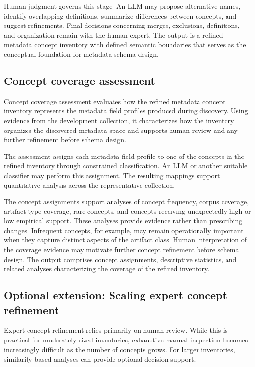 \documentclass{article}
\begin{document}
Human judgment governs this stage. An LLM may propose alternative names, identify overlapping definitions, summarize differences between concepts, and suggest refinements. Final decisions concerning merges, exclusions, definitions, and organization remain with the human expert. The output is a refined metadata concept inventory with defined semantic boundaries that serves as the conceptual foundation for metadata schema design.

\subsection{Concept coverage assessment}

Concept coverage assessment evaluates how the refined metadata concept inventory represents the metadata field profiles produced during discovery. Using evidence from the development collection, it characterizes how the inventory organizes the discovered metadata space and supports human review and any further refinement before schema design.

The assessment assigns each metadata field profile to one of the concepts in the refined inventory through constrained classification. An LLM or another suitable classifier may perform this assignment. The resulting mappings support quantitative analysis across the representative collection.

The concept assignments support analyses of concept frequency, corpus coverage, artifact-type coverage, rare concepts, and concepts receiving unexpectedly high or low empirical support. These analyses provide evidence rather than prescribing changes. Infrequent concepts, for example, may remain operationally important when they capture distinct aspects of the artifact class. Human interpretation of the coverage evidence may motivate further concept refinement before schema design. The output comprises concept assignments, descriptive statistics, and related analyses characterizing the coverage of the refined inventory.

\subsection{Optional extension: Scaling expert concept refinement}

Expert concept refinement relies primarily on human review. While this is practical for moderately sized inventories, exhaustive manual inspection becomes increasingly difficult as the number of concepts grows. For larger inventories, similarity-based analyses can provide optional decision support.
\end{document}
